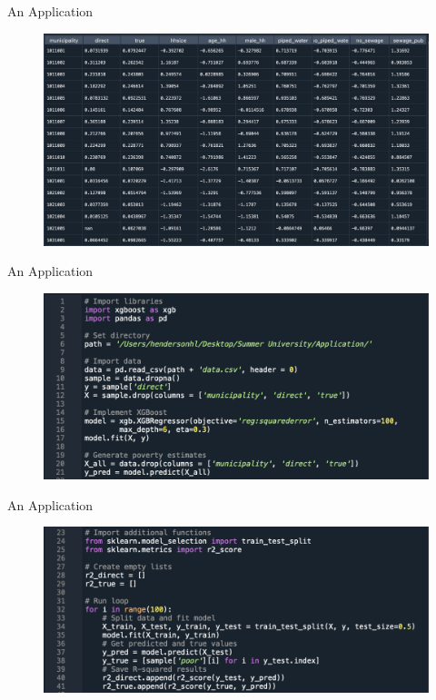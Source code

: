 \documentclass[aspectratio=169, xcolor=dvipsnames]{beamer}
\begin{document}
\begin{frame}{An Application}
\begin{figure}[h!]
  \centering
  \includegraphics[width=0.7 \textwidth]{Data}
\end{figure}
\end{frame}

\begin{frame}{An Application}
\begin{figure}[h!]
  \centering
  \includegraphics[width=0.8 \textwidth]{Code_1}
\end{figure}
\end{frame}

\begin{frame}{An Application}
\begin{figure}[h!]
  \centering
  \includegraphics[width=0.8 \textwidth]{Code_2}
\end{figure}
\end{frame}
\end{document}
